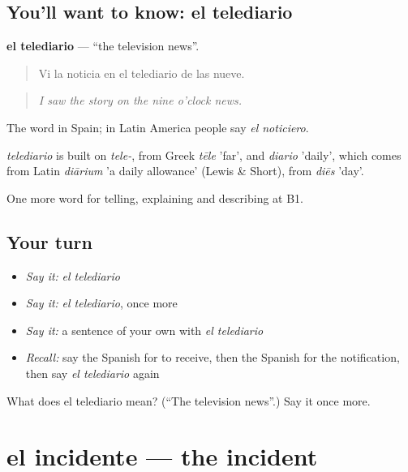 \subsection*{You'll want to know: el telediario}
\textbf{el telediario} — \textquotedblleft{}the television news\textquotedblright{}.

\begin{quote}
Vi la noticia en el telediario de las nueve.
\end{quote}

\begin{quote}
\emph{I saw the story on the nine o'clock news.}
\end{quote}

The word in Spain; in Latin America people say \emph{el noticiero}.

\begin{cousinweb}
\emph{telediario} is built on \emph{tele-}, from Greek \emph{tēle} 'far', and \emph{diario} 'daily', which comes from Latin \emph{diārium} 'a daily allowance' (Lewis \& Short), from \emph{diēs} 'day'.
\end{cousinweb}

\begin{grammarlens}[title={What you've built}]
One more word for telling, explaining and describing at B1.
\end{grammarlens}

\subsection*{Your turn}
\begin{itemize}
\raggedright
  \item \emph{Say it:} \emph{el telediario}
  \item \emph{Say it:} \emph{el telediario}, once more
  \item \emph{Say it:} a sentence of your own with \emph{el telediario}
  \item \emph{Recall:} say the Spanish for to receive, then the Spanish for the notification, then say \emph{el telediario} again
\end{itemize}

\begin{tcolorbox}[breakable,colback=teal!4,colframe=teal!35!black,title={Before you move on}]
What does el telediario mean? (\textquotedblleft{}The television news\textquotedblright{}.) Say it once more.
\end{tcolorbox}
\section[el incidente]{el incidente — the incident}

